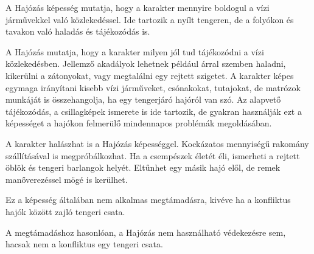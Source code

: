 
A Hajózás képesség mutatja, hogy a karakter mennyire boldogul a vízi járművekkel való közlekedéssel. Ide tartozik a nyílt tengeren, de a folyókon és tavakon való haladás és tájékozódás is.

\overcome A Hajózás mutatja, hogy a karakter milyen jól tud tájékozódni a vízi közlekedésben. Jellemző akadályok lehetnek például árral szemben haladni, kikerülni a zátonyokat, vagy megtalálni egy rejtett szigetet. A karakter képes egymaga irányítani kisebb vízi járműveket, csónakokat, tutajokat, de matrózok munkáját is összehangolja, ha egy tengerjáró hajóról van szó. Az alapvető tájékozódás, a csillagképek ismerete is ide tartozik, de gyakran használják ezt a képességet a hajókon felmerülő mindennapos problémák megoldásában.

\advantage A karakter halászhat is a Hajózás képességgel. Kockázatos mennyiségű rakomány szállításával is megpróbálkozhat. Ha a csempészek életét éli, ismerheti a rejtett öblök és tengeri barlangok helyét. Eltűnhet egy másik hajó elől, de remek manőverezéssel mögé is kerülhet.

\attack Ez a képesség általában nem alkalmas megtámadásra, kivéve ha a konfliktus hajók között zajló tengeri csata.

 A megtámadáshoz hasonlóan, a Hajózás nem használható védekezésre sem, hacsak nem a konfliktus egy tengeri csata.




